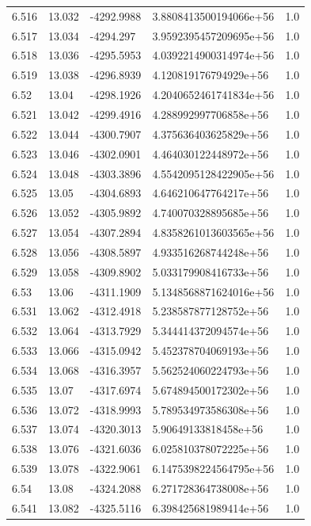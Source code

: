 \begin{tabular}{lllll}
6.516 & 13.032 & -4292.9988 & 3.8808413500194066e+56 & 1.0 \\
6.517 & 13.034 & -4294.297 & 3.9592395457209695e+56 & 1.0 \\
6.518 & 13.036 & -4295.5953 & 4.0392214900314974e+56 & 1.0 \\
6.519 & 13.038 & -4296.8939 & 4.120819176794929e+56 & 1.0 \\
6.52 & 13.04 & -4298.1926 & 4.2040652461741834e+56 & 1.0 \\
6.521 & 13.042 & -4299.4916 & 4.288992997706858e+56 & 1.0 \\
6.522 & 13.044 & -4300.7907 & 4.375636403625829e+56 & 1.0 \\
6.523 & 13.046 & -4302.0901 & 4.464030122448972e+56 & 1.0 \\
6.524 & 13.048 & -4303.3896 & 4.5542095128422905e+56 & 1.0 \\
6.525 & 13.05 & -4304.6893 & 4.646210647764217e+56 & 1.0 \\
6.526 & 13.052 & -4305.9892 & 4.740070328895685e+56 & 1.0 \\
6.527 & 13.054 & -4307.2894 & 4.8358261013603565e+56 & 1.0 \\
6.528 & 13.056 & -4308.5897 & 4.933516268744248e+56 & 1.0 \\
6.529 & 13.058 & -4309.8902 & 5.033179908416733e+56 & 1.0 \\
6.53 & 13.06 & -4311.1909 & 5.1348568871624016e+56 & 1.0 \\
6.531 & 13.062 & -4312.4918 & 5.238587877128752e+56 & 1.0 \\
6.532 & 13.064 & -4313.7929 & 5.344414372094574e+56 & 1.0 \\
6.533 & 13.066 & -4315.0942 & 5.452378704069193e+56 & 1.0 \\
6.534 & 13.068 & -4316.3957 & 5.562524060224793e+56 & 1.0 \\
6.535 & 13.07 & -4317.6974 & 5.674894500172302e+56 & 1.0 \\
6.536 & 13.072 & -4318.9993 & 5.789534973586308e+56 & 1.0 \\
6.537 & 13.074 & -4320.3013 & 5.90649133818458e+56 & 1.0 \\
6.538 & 13.076 & -4321.6036 & 6.025810378072225e+56 & 1.0 \\
6.539 & 13.078 & -4322.9061 & 6.1475398224564795e+56 & 1.0 \\
6.54 & 13.08 & -4324.2088 & 6.271728364738008e+56 & 1.0 \\
6.541 & 13.082 & -4325.5116 & 6.398425681989414e+56 & 1.0 \\

\end{tabular}

